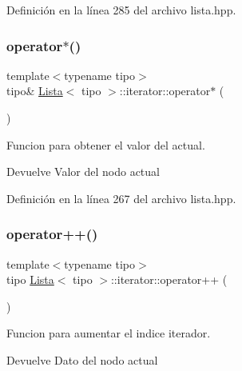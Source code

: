 Definición en la línea 285 del archivo lista.\+hpp.

\mbox{\label{classLista_1_1iterator_a2a48c3991820aef39d777df2c8e19664}} 
\subsubsection{\texorpdfstring{operator$\ast$()}{operator*()}}
{\footnotesize\ttfamily template$<$typename tipo$>$ \\
tipo\& \hyperlink{classLista}{Lista}$<$ tipo $>$\+::iterator\+::operator$\ast$ (\begin{DoxyParamCaption}{ }\end{DoxyParamCaption})\hspace{0.3cm}{\ttfamily [inline]}}



Funcion para obtener el valor del actual. 

\begin{DoxyReturn}{Devuelve}
Valor del nodo actual 
\end{DoxyReturn}


Definición en la línea 267 del archivo lista.\+hpp.

\mbox{\label{classLista_1_1iterator_af8c7d385ce8bc7c62b8bc806db714ae9}} 
\subsubsection{\texorpdfstring{operator++()}{operator++()}\hspace{0.1cm}{\footnotesize\ttfamily [1/2]}}
{\footnotesize\ttfamily template$<$typename tipo$>$ \\
tipo \hyperlink{classLista}{Lista}$<$ tipo $>$\+::iterator\+::operator++ (\begin{DoxyParamCaption}{ }\end{DoxyParamCaption})\hspace{0.3cm}{\ttfamily [inline]}}



Funcion para aumentar el indice iterador. 

\begin{DoxyReturn}{Devuelve}
Dato del nodo actual 
\end{DoxyReturn}


